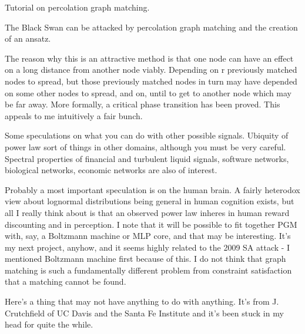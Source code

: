 \documentclass[12pt]{article}
\begin{document}
Tutorial on percolation graph matching.

The Black Swan can be attacked by percolation graph matching and the creation of an ansatz.

The reason why this is an attractive method is that one node can have an effect on a long distance from another node viably. Depending on r previously matched nodes to spread, but those previously matched nodes in turn may have depended on some other nodes to spread, and on, until to get to another node which may be far away. More formally, a critical phase transition has been proved. This appeals to me intuitively a fair bunch.

Some speculations on what you can do with other possible signals. Ubiquity of power law sort of things in other domains, although you must be very careful. Spectral properties of financial and turbulent liquid signals, software networks, biological networks, economic networks are also of interest.

Probably a most important speculation is on the human brain. A fairly heterodox view about lognormal distributions being general in human cognition exists, but all I really think about is that an observed power law inheres in human reward discounting and in perception. I note that it will be possible to fit together PGM with, say, a Boltzmann machine or MLP core, and that may be interesting. It's my next project, anyhow, and it seems highly related to the 2009 SA attack - I mentioned Boltzmann machine first because of this. I do not think that graph matching is such a fundamentally different problem from constraint satisfaction that a matching cannot be found.

Here's a thing that may not have anything to do with anything. It's from J. Crutchfield of UC Davis and the Santa Fe Institute and it's been stuck in my head for quite the while.
\end{document}
